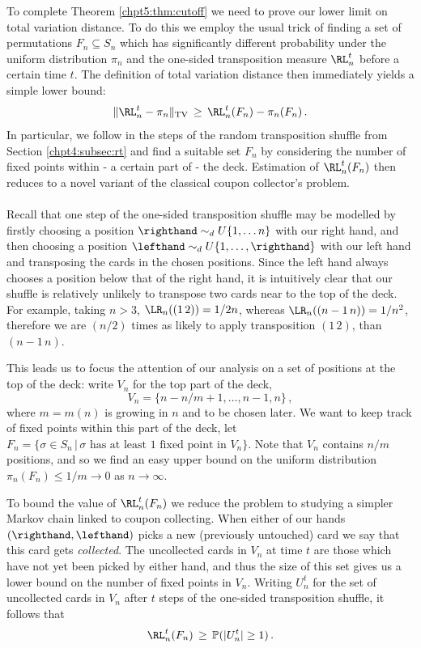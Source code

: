 \documentclass[11pt]{report}
\begin{document}
To complete Theorem \ref{chpt5:thm:cutoff} we need to prove our lower limit 
on total variation distance. To do this we employ the usual trick of finding a set of 
permutations $F_n\subseteq S_n$  which has significantly different 
probability under the uniform distribution $\pi_n$ and the one-sided 
transposition measure $\RL_n^t$ before a certain time $t$. 
The definition of total variation distance 
then immediately yields a simple lower bound:
\[ \lVert \RL_n^t -\pi_n \rVert_{\textnormal{TV}}\, \ge\, \RL_n^t(F_n) - 
\pi_n(F_n) \,. \]
In particular, we follow in the steps of the random transposition shuffle from Section \ref{chpt4:subsec:rt} and 
find a suitable set $F_n$ by considering the number of fixed points within 
- a certain part of - the deck. Estimation of $\RL_n^t(F_n)$ then reduces 
to a novel variant of the classical coupon collector's problem.






\paragraph{}
Recall that one step of the one-sided transposition shuffle may be modelled 
by 
firstly choosing a position $\righthand \sim_{d} U\{1,\dots n\}$ with our right 
hand, and 
then choosing a position $\lefthand\sim_{d} U\{1,\dots ,\righthand\}$ with our 
left 
hand and 
transposing the cards in the chosen positions.
Since the left hand always chooses a position below that of the right hand, 
it is intuitively clear that our shuffle is relatively unlikely to 
transpose two cards near to the top of the deck. For example, taking $n>3$,  $\LR_{n}((1\,2)) = 
1/2n$, whereas $\LR_{n}((n-1 \, n)) = 1/n^{2}$, therefore we are $(n/2)$ times as likely	to apply transposition $(1\,2)$, than $(n-1 \, n)$. 

This leads us to focus  the
attention of our analysis on a set of positions at the top of the deck:  write $V_n$ for 
the top part of the deck, 
\[ V_n = \{n-n/m+1,\dots,n-1,n\} \,, \]
where $m=m(n)$ is growing in $n$ and to be chosen later. We want to keep track of 
fixed points within this part of the deck, let $ F_n = \{\sigma\in S_n \, | \, \text{$\sigma$ has at least 1 fixed point in 	$V_n$}\}.$
Note that $V_n$ contains $n/m$ positions, and so we find an easy upper 
bound on the uniform distribution $\pi_{n}(F_n) \leq 1/m \to 0$ as $n\to 
\infty$.

To bound the value of $\RL_n^t(F_n)$ we  
reduce the problem to studying a simpler Markov chain linked to coupon 
collecting. When either of our hands $(\righthand, \lefthand)$ picks a new 
(previously 
untouched) card we say that this card gets \emph{collected}. The  
uncollected cards in $V_n$ at time $t$ are those which have not yet been 
picked 
by either hand, and thus the size of this set gives us a lower bound on the 
number of fixed points in $V_n$. Writing $U_n^t$ for the set of uncollected 
cards in $V_n$ after $t$ steps of the one-sided transposition shuffle, it follows that 
\begin{eqnarray}
\label{Ineq1}
\RL_{n}^{t}(F_n) \,\geq\, \mathbb{P}(|U^{t}_{n}| \ge 1 )\,.
\end{eqnarray}
\end{document}
